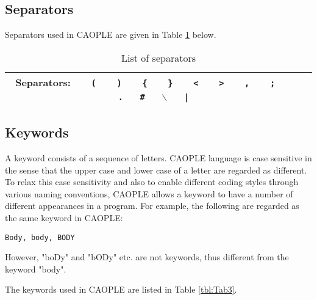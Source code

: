 \documentclass[english]{report}
\begin{document}
\subsection{Separators}

Separators used in CAOPLE are given in Table \ref{tbl:TabSeparators} below. 

\begin{table}[h]
\caption{List of separators}\label{tbl:TabSeparators}
\begin{center}
\begin{tabular}{|c|c|}
\hline
Separators: ~~~\texttt{(}~~~ \texttt{)}~~~ \texttt{\{}~~~ \texttt{\}}~~~ \texttt{<}~~~ \texttt{>}~~~ \texttt{,}~~~ \texttt{;}~~~ \texttt{.}~~~\texttt{\#}~~~\texttt{$\backslash$}~~~\texttt{|}\\
\hline
\end{tabular}
\end{center}
\end{table}%

\subsection{Keywords}\label{sect:keywords}

A keyword consists of a sequence of letters. CAOPLE language is case sensitive in the sense that the upper case and lower case of a letter are regarded as different. To relax this case sensitivity and also to enable different coding styles through various naming conventions, CAOPLE allows a keyword to have a number of different appearances in a program.  For example, the following are regarded as the same keyword in CAOPLE:
\begin{center}
\texttt{Body, body, BODY}
\end{center}

However, "boDy" and "bODy" etc. are not keywords, thus different from the keyword "body". 

The keywords used in CAOPLE are listed in Table \ref{tbl:Tab3}. 
\end{document}
